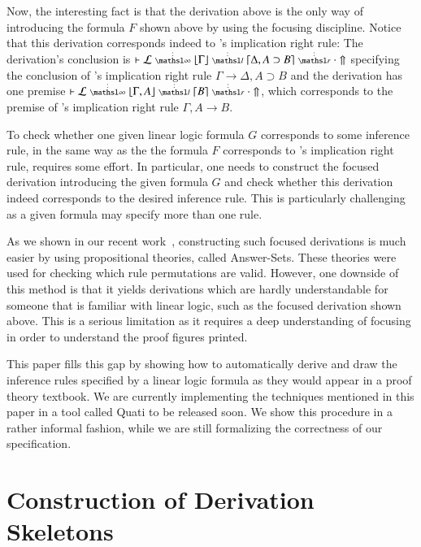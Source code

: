 \documentclass[a4paper,10pt]{article}
\newcommand\lra{\longrightarrow}
\begin{document}
Now, the interesting fact is that the derivation above is the only way of introducing the formula $F$ 
shown above by using the focusing 
discipline. Notice that this derivation corresponds indeed to \mLJ's 
implication right rule: The derivation's conclusion is $\llfDash \lEnc \ndots{\infty}
\lft{\Gamma} \ndots{l} {\rght{\Delta, A \supset B}}
\ndots{r} \cdot \Uparrow$ specifying the conclusion of \mLJ's 
implication right rule $\Gamma \lra \Delta, A \supset B$ and 
the derivation has one premise $\llfDash \lEnc \ndots{\infty} \lft{\Gamma, A} \ndots{l} \rght{B} \ndots{r}
\cdot \Uparrow$, which corresponds to the premise of \mLJ's 
implication right rule $\Gamma, A \lra B$.

To check whether one given linear logic formula $G$ corresponds to some inference rule, in the same way as the 
the formula $F$ corresponds to \mLJ's implication right rule, requires some effort. In particular, one needs
to construct the focused derivation introducing the given formula $G$ and check whether this derivation indeed
corresponds to the desired inference rule. This is particularly challenging as a given formula may specify 
more than one rule. 

As we shown in our recent work~\cite{nigam13iclp}, constructing such focused derivations is 
much easier by using propositional theories, called Answer-Sets. These theories were used for
checking which rule permutations are valid. However, one downside of this method is that it 
yields derivations which are hardly understandable for someone that is familiar with linear logic, 
such as the focused derivation shown above. This is a serious limitation as it requires
a deep understanding of focusing in order to understand the proof figures printed.

This paper fills this gap by showing how to automatically derive and draw the inference rules
specified by a linear logic formula as they would appear in a proof theory textbook. We are currently
implementing the techniques mentioned in this paper in a tool called Quati to be released soon.
We show this procedure in a rather informal fashion, while we are still formalizing the correctness of our specification.


\section{Construction of Derivation Skeletons}
\end{document}
